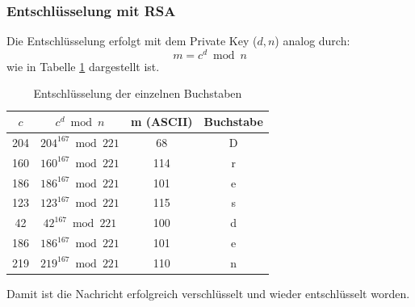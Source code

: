 \subsubsection{Entschlüsselung mit RSA}
Die Entschlüsselung erfolgt mit dem Private Key ($d, n$) analog durch:
\[
m = c^d \bmod n
\]
wie in Tabelle \ref{tab:decryption_dresden} dargestellt ist.
\begin{table}[H]
    \centering
    \begin{tabular}{|c|c|c|c|}
        \hline
        $c$ & $c^d \bmod n$ & m (ASCII) & Buchstabe \\
        \hline
        204 & $204^{167} \bmod 221$ & 68 & D \\
        160 & $160^{167} \bmod 221$ & 114 & r \\
        186 & $186^{167} \bmod 221$ & 101 & e \\
        123 & $123^{167} \bmod 221$ & 115 & s \\
        42 & $42^{167} \bmod 221$ & 100 & d \\
        186 & $186^{167} \bmod 221$ & 101 & e \\
        219 & $219^{167} \bmod 221$ & 110 & n \\
        \hline
    \end{tabular}
    \caption{Entschlüsselung der einzelnen Buchstaben}
    \label{tab:decryption_dresden}
\end{table}
Damit ist die Nachricht  erfolgreich verschlüsselt und wieder entschlüsselt worden.



